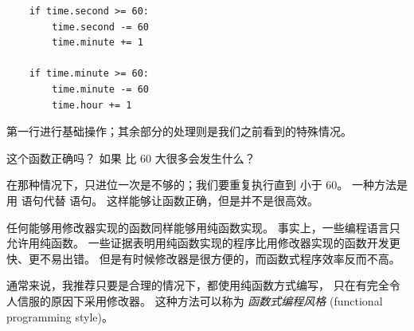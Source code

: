 {\begin{lstlisting}
    if time.second >= 60:
        time.second -= 60
        time.minute += 1

    if time.minute >= 60:
        time.minute -= 60
        time.hour += 1
\end{lstlisting}


第一行进行基础操作；其余部分的处理则是我们之前看到的特殊情况。



这个函数正确吗？ 如果  比 60 大很多会发生什么？


在那种情况下，只进位一次是不够的；我们要重复执行直到  小于 60。
一种方法是用  语句代替  语句。
这样能够让函数正确，但是并不是很高效。


任何能够用修改器实现的函数同样能够用纯函数实现。
事实上，一些编程语言只允许用纯函数。
一些证据表明用纯函数实现的程序比用修改器实现的函数开发更快、更不易出错。
但是有时候修改器是很方便的，而函数式程序效率反而不高。


通常来说，我推荐只要是合理的情况下，都使用纯函数方式编写，
只在有完全令人信服的原因下采用修改器。
这种方法可以称为 {\em 函数式编程风格} (functional programming style)。

}
